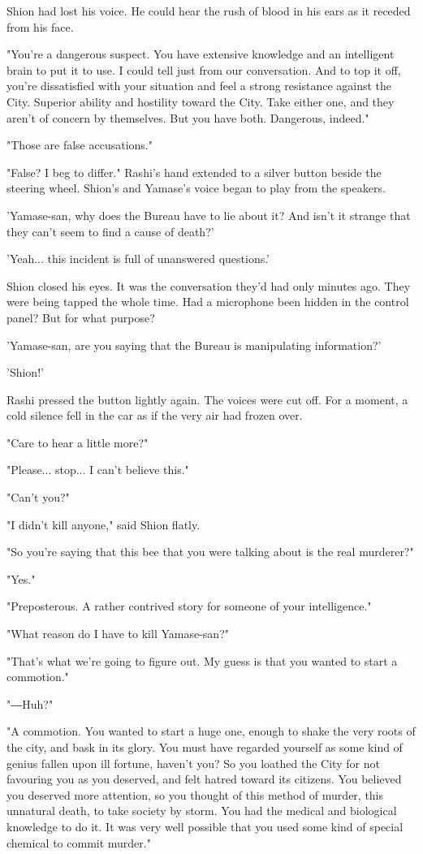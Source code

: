 Shion had lost his voice. He could hear the rush of blood in his ears as
it receded from his face.

"You're a dangerous suspect. You have extensive knowledge and an
intelligent brain to put it to use. I could tell just from our
conversation. And to top it off, you're dissatisfied with your situation
and feel a strong resistance against the City. Superior ability and
hostility toward the City. Take either one, and they aren't of concern
by themselves. But you have both. Dangerous, indeed."

"Those are false accusations."

"False? I beg to differ." Rashi's hand extended to a silver button
beside the steering wheel. Shion's and Yamase's voice began to play from
the speakers.

'Yamase-san, why does the Bureau have to lie about it? And isn't it
strange that they can't seem to find a cause of death?'

'Yeah... this incident is full of unanswered questions.'

Shion closed his eyes. It was the conversation they'd had only minutes
ago. They were being tapped the whole time. Had a microphone been hidden
in the control panel? But for what purpose?

'Yamase-san, are you saying that the Bureau is manipulating
information?'

'Shion!'

Rashi pressed the button lightly again. The voices were cut off. For a
moment, a cold silence fell in the car as if the very air had frozen
over.

"Care to hear a little more?"

"Please... stop... I can't believe this."

"Can't you?"

"I didn't kill anyone," said Shion flatly.

"So you're saying that this bee that you were talking about is the real
murderer?"

"Yes."

"Preposterous. A rather contrived story for someone of your
intelligence."

"What reason do I have to kill Yamase-san?"

"That's what we're going to figure out. My guess is that you wanted to
start a commotion."

"―Huh?"

"A commotion. You wanted to start a huge one, enough to shake the very
roots of the city, and bask in its glory. You must have regarded
yourself as some kind of genius fallen upon ill fortune, haven't you? So
you loathed the City for not favouring you as you deserved, and felt
hatred toward its citizens. You believed you deserved more attention, so
you thought of this method of murder, this unnatural death, to take
society by storm. You had the medical and biological knowledge to do it.
It was very well possible that you used some kind of special chemical to
commit murder."

